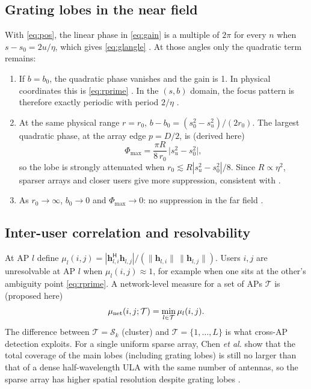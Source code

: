 \documentclass[11pt]{article}
\newcommand{\h}{\mathbf{h}}
\begin{document}
\subsection{Grating lobes in the near field}
\label{sec:gl-math}
With \eqref{eq:pos}, the linear phase in \eqref{eq:gain} is a multiple of $2\pi$ for every $n$ when $s-s_0=2u/\eta$, which gives \eqref{eq:glangle} \cite[Lemma~5]{zhou2025sparse}. At those angles only the quadratic term remains:
\begin{enumerate}
  \item If $b=b_0$, the quadratic phase vanishes and the gain is 1. In physical coordinates this is \eqref{eq:rprime} \cite[Lemma~6]{zhou2025sparse}. In the $(s,b)$ domain, the focus pattern is therefore exactly periodic with period $2/\eta$ \cite[Sec.~IV-A]{chen2024nearfield}.
  \item At the same physical range $r=r_0$, $b-b_0=(s_0^2-s_u^2)/(2r_0)$. The largest quadratic phase, at the array edge $p=D/2$, is (derived here)
  \begin{equation}
    \Phi_{\max}=\frac{\pi R}{8\,r_0}\,\big|s_u^2-s_0^2\big|,
  \end{equation}
  so the lobe is strongly attenuated when $r_0\lesssim R|s_u^2-s_0^2|/8$. Since $R\propto\eta^2$, sparser arrays and closer users give more suppression, consistent with \cite[Corollary~3]{chen2025exploring}.
  \item As $r_0\to\infty$, $b_0\to0$ and $\Phi_{\max}\to0$: no suppression in the far field \cite{chen2025exploring}.
\end{enumerate}

\subsection{Inter-user correlation and resolvability}
At AP $l$ define $\mu_l(i,j)=|\h_{l,i}^{\mathsf H}\h_{l,j}|/(\|\h_{l,i}\|\,\|\h_{l,j}\|)$. Users $i,j$ are unresolvable at AP $l$ when $\mu_l(i,j)\approx1$, for example when one sits at the other's ambiguity point \eqref{eq:rprime}. A network-level measure for a set of APs $\mathcal T$ is (proposed here)
\begin{equation}
  \mu_{\rm net}(i,j;\mathcal T)=\min_{l\in\mathcal T}\mu_l(i,j).
\end{equation}
The difference between $\mathcal T=\mathcal S_k$ (cluster) and $\mathcal T=\{1,\dots,L\}$ is what cross-AP detection exploits. For a single uniform sparse array, Chen \emph{et al.} show that the total coverage of the main lobes (including grating lobes) is still no larger than that of a dense half-wavelength ULA with the same number of antennas, so the sparse array has higher spatial resolution despite grating lobes \cite[Property~3]{chen2024nearfield}.
\end{document}

